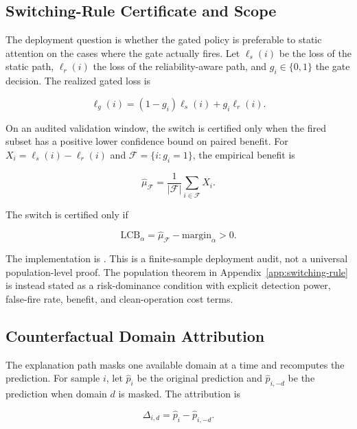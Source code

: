 \documentclass[11pt]{article}
\begin{document}
\subsection{Switching-Rule Certificate and Scope}

The deployment question is whether the gated policy is preferable to static
attention on the cases where the gate actually fires. Let $\ell_s(i)$ be the
loss of the static path, $\ell_r(i)$ the loss of the reliability-aware path,
and $g_i\in\{0,1\}$ the gate decision. The realized gated loss is

\begin{equation}
  \ell_g(i) = (1-g_i)\ell_s(i) + g_i\ell_r(i).
\end{equation}

On an audited validation window, the switch is certified only when the fired
subset has a positive lower confidence bound on paired benefit. For
$X_i=\ell_s(i)-\ell_r(i)$ and $\mathcal{F}=\{i:g_i=1\}$, the empirical benefit is

\begin{equation}
  \hat{\mu}_{\mathcal{F}} =
  \frac{1}{|\mathcal{F}|}\sum_{i\in\mathcal{F}} X_i.
\end{equation}

The switch is certified only if

\begin{equation}
  \mathrm{LCB}_{\alpha} =
  \hat{\mu}_{\mathcal{F}} - \mathrm{margin}_{\alpha} > 0.
\end{equation}

The implementation is . This is a
finite-sample deployment audit, not a universal population-level proof. The
population theorem in Appendix~\ref{app:switching-rule} is instead stated as a
risk-dominance condition with explicit detection power, false-fire rate,
benefit, and clean-operation cost terms.

\subsection{Counterfactual Domain Attribution}

The explanation path masks one available domain at a time and recomputes the
prediction. For sample $i$, let $\hat{p}_i$ be the original prediction and
$\hat{p}_{i,-d}$ be the prediction when domain $d$ is masked. The attribution is

\begin{equation}
  \Delta_{i,d} = \hat{p}_i - \hat{p}_{i,-d}.
\end{equation}
\end{document}
